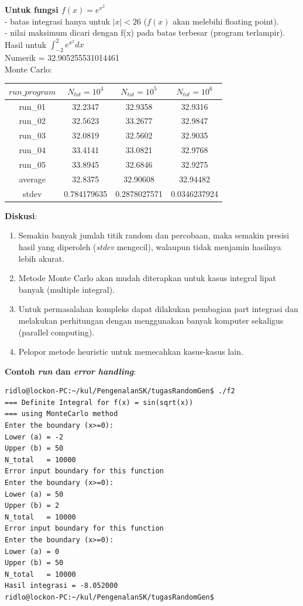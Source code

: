 \documentclass[paper=a4, fontsize=11pt]{scrartcl}
\numberwithin{equation}{section} %
\numberwithin{figure}{section} %
\numberwithin{table}{section} %
\begin{document}
\textbf{Untuk fungsi $f(x) = e^{x^{2}}$}\\
- batas integrasi hanya untuk $\vert x \vert < 26$ ($f(x)$ akan melebihi floating point).\\
- nilai maksimum dicari dengan f(x) pada batas terbesar (program terlampir).\\

Hasil untuk $\int_{-2}^{2} e^{x^{2}} dx$\\
Numerik = 32.905255531014461\\
Monte Carlo:
\begin{table}[ht]
\begin{tabular}{c c c c}
\hline
$run\_program$ & $N_{tot} = 10^{4}$ & $N_{tot} = 10^{5}$ & $N_{tot} = 10^{6}$  \\ [0.5ex]
\hline 
run\_01 & 32.2347 & 32.9358 & 32.9316 \\
run\_02 & 32.5623 & 33.2677 & 32.9847 \\
run\_03 & 32.0819 & 32.5602 & 32.9035 \\
run\_04 & 33.4141 & 33.0821 & 32.9768\\
run\_05 & 33.8945 & 32.6846 & 32.9275\\ [0.5ex]
\hline 
average & 32.8375 &	32.90608	 & 32.94482\\
\hline
stdev & 0.784179635 & 0.2878027571 & 0.0346237924\\
\hline
\end{tabular}
\end{table}

\newpage
\textbf{Diskusi}:
\begin{enumerate}
\item Semakin banyak jumlah titik random dan percobaan, maka semakin presisi hasil yang diperoleh (\textit{stdev} mengecil), walaupun tidak menjamin hasilnya lebih akurat.
\item Metode Monte Carlo akan mudah diterapkan untuk kasus integral lipat banyak (multiple integral).
\item Untuk permasalahan kompleks dapat dilakukan pembagian part integrasi dan melakukan perhitungan dengan menggunakan banyak komputer sekaligus (parallel computing).
\item Pelopor metode heuristic untuk memecahkan kasus-kasus lain.
\end{enumerate}

\vspace{1cm}
\textbf{Contoh \textit{run} dan \textit{error handling}}:\\
\begin{small}
\begin{verbatim}
ridlo@lockon-PC:~/kul/PengenalanSK/tugasRandomGen$ ./f2 
=== Definite Integral for f(x) = sin(sqrt(x))
=== using MonteCarlo method
Enter the boundary (x>=0):
Lower (a) = -2
Upper (b) = 50
N_total   = 10000
Error input boundary for this function
Enter the boundary (x>=0):
Lower (a) = 50
Upper (b) = 2
N_total   = 10000
Error input boundary for this function
Enter the boundary (x>=0):
Lower (a) = 0
Upper (b) = 50
N_total   = 10000
Hasil integrasi = -8.052000
ridlo@lockon-PC:~/kul/PengenalanSK/tugasRandomGen$ 
\end{verbatim}
\end{small}
\end{document}
